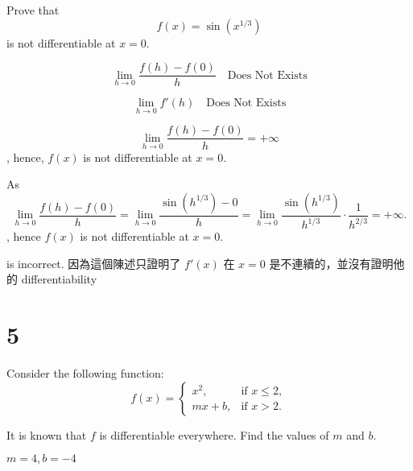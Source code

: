 \documentclass{article}
\begin{document}
\begin{problem}
Prove that
\[
	f(x) = \sin(x^{1/3})
\]
is not differentiable at $x=0$.
\end{problem}
\vspace{-12pt}
\begin{wrong}[1]
\[
\lim_{h \to 0} \frac{f(h) - f(0)}{h} \quad \text{Does Not Exists}
\]
\end{wrong}
\vspace{-12pt}
\begin{wrong}[2]
\[
\lim_{h \to 0} f'(h) \quad \text{Does Not Exists}
\]
\end{wrong}
\vspace{-12pt}
\begin{cor}
\[
\lim_{h \to 0} \frac{f(h) - f(0)}{h} = +\infty
\]
, hence, $f(x)$ is not differentiable at $x=0$.
\end{cor}

\begin{reason}
	As
	\[
	\lim_{h \to 0} \frac{f(h) - f(0)}{h} 
	= \lim_{h \to 0} \frac{\sin(h^{1/3}) - 0}{h} 
	= \lim_{h \to 0} \frac{\sin(h^{1/3})}{h^{1/3}} \cdot \frac{1}{h^{2/3}} 
	= +\infty.
	\]
	, hence $f(x)$ is not differentiable at $x=0$.
	\vspace{0.5em}
	\begin{note}
	 is incorrect. 因為這個陳述只證明了 $f'(x)$ 在 $x=0$ 是不連續的，並沒有證明他的 differentiability
	\end{note}
	\vspace{0.5em}

\end{reason}

\newpage

\section{5}
\begin{problem}
Consider the following function:
\[
f(x) =
\begin{cases}
x^2, & \text{if } x \le 2, \\[6pt]
mx + b, & \text{if } x > 2.
\end{cases}
\]

It is known that \( f \) is differentiable everywhere. Find the values of \( m \) and \( b \).

\end{problem}
\vspace{-12pt}
\begin{cor}
	$m=4, b=-4$
\end{cor}
\end{document}
